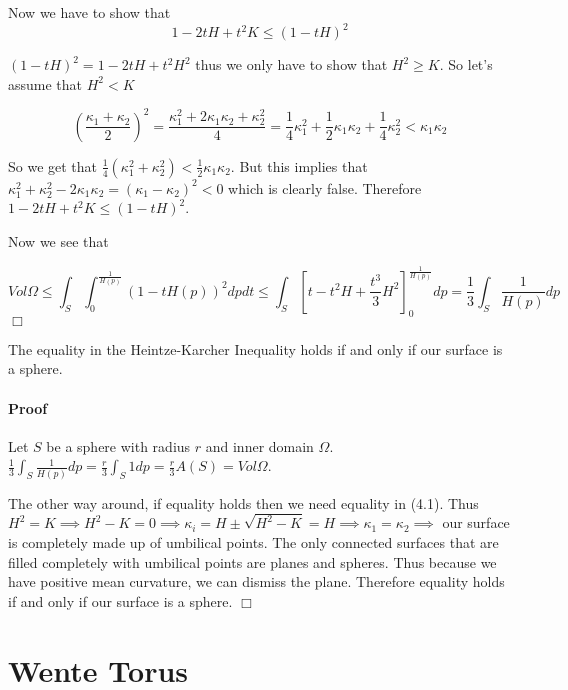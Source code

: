 \documentclass[a4paper,12pt]{report}
\begin{document}
Now we have to show that 
\begin{equation}
1 - 2tH + t^{2} K \leq (1 - tH)^{2}
\end{equation}


$(1-tH)^{2} = 1 - 2tH + t^{2}H^{2}$ thus we only have to show that $H^{2} \geq  K$. So let's assume that $H^{2} < K$

\[
(\frac{\kappa_{1} + \kappa_{2}}{2})^{2} = \frac{\kappa_{1}^{2} + 2\kappa_{1}\kappa_{2} + \kappa_{2}^{2}}{4} = \frac{1}{4}\kappa_{1}^{2} + \frac{1}{2}\kappa_{1}\kappa_{2} + \frac{1}{4}\kappa_{2}^{2} < \kappa_{1}\kappa_{2}
\]

So we get that $\frac{1}{4}(\kappa_{1}^{2} + \kappa_{2}^{2}) < \frac{1}{2}\kappa_{1}\kappa_{2}$. But this implies that $\kappa_{1}^{2} + \kappa_{2}^{2} - 2\kappa_{1}\kappa_{2} = (\kappa_{1} - \kappa_{2})^{2} < 0$ which is clearly false. Therefore $1-2tH + t^{2}K \leq (1-tH)^{2}$.

Now we see that

\[
Vol \Omega \leq \int_{S} \int_{0}^{\frac{1}{H(p)} } (1-tH(p))^{2} dpdt \leq \int_{S} \left[t - t^{2}H + \frac{t^{3}}{3} H^{2} \right]_{0}^{\frac{1}{H(p)}} dp = \frac{1}{3}\int_{S} \frac{1}{H(p)} dp
\] \hfill $\Box$

\begin{theorem}
The equality in the Heintze-Karcher Inequality holds if and only if our surface is a sphere.
\end{theorem}

\paragraph{Proof} Let $S$ be a sphere with radius $r$ and inner domain $\Omega$. $\frac{1}{3}\int_{S} \frac{1}{H(p)}dp = \frac{r}{3}\int_{S} 1 dp = \frac{r}{3} A(S) = Vol\Omega$. 

The other way around, if equality holds then we need equality in (4.1). Thus $H^{2} = K
 \implies H^{2} - K = 0 \implies \kappa_{i} = H \pm \sqrt{H^{2}-K} = H \implies \kappa_{1} = \kappa_{2} \implies$ our surface is completely made up of umbilical points. The only connected surfaces that are filled completely with umbilical points are planes and spheres. Thus because we have positive mean curvature, we can dismiss the plane. Therefore equality holds if and only if our surface is a sphere. \hfill $\Box$

\section{Wente Torus}
\end{document}
